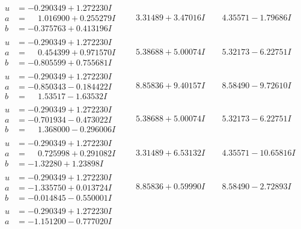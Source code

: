 \documentclass[1p]{elsarticle_modified}
\theoremstyle{definition}
\begin{document}
$$\begin{array}{c|c|c}
 \hline 
\begin{aligned}
u &= -0.290349 + 1.272230 I \\
a &= \phantom{-}1.016900 + 0.255279 I \\
b &= -0.375763 + 0.413196 I\end{aligned}
 & \phantom{-}3.31489 + 3.47016 I & \phantom{-}4.35571 - 1.79686 I \\ \hline\begin{aligned}
u &= -0.290349 + 1.272230 I \\
a &= \phantom{-}0.454399 + 0.971570 I \\
b &= -0.805599 + 0.755681 I\end{aligned}
 & \phantom{-}5.38688 + 5.00074 I & \phantom{-}5.32173 - 6.22751 I \\ \hline\begin{aligned}
u &= -0.290349 + 1.272230 I \\
a &= -0.850343 - 0.184422 I \\
b &= \phantom{-}1.53517 - 1.63532 I\end{aligned}
 & \phantom{-}8.85836 + 9.40157 I & \phantom{-}8.58490 - 9.72610 I \\ \hline\begin{aligned}
u &= -0.290349 + 1.272230 I \\
a &= -0.701934 - 0.473022 I \\
b &= \phantom{-}1.368000 - 0.296006 I\end{aligned}
 & \phantom{-}5.38688 + 5.00074 I & \phantom{-}5.32173 - 6.22751 I \\ \hline\begin{aligned}
u &= -0.290349 + 1.272230 I \\
a &= \phantom{-}0.725998 + 0.291082 I \\
b &= -1.32280 + 1.23898 I\end{aligned}
 & \phantom{-}3.31489 + 6.53132 I & \phantom{-}4.35571 - 10.65816 I \\ \hline\begin{aligned}
u &= -0.290349 + 1.272230 I \\
a &= -1.335750 + 0.013724 I \\
b &= -0.014845 - 0.550001 I\end{aligned}
 & \phantom{-}8.85836 + 0.59990 I & \phantom{-}8.58490 - 2.72893 I \\ \hline\begin{aligned}
u &= -0.290349 + 1.272230 I \\
a &= -1.151200 - 0.777020 I \\

\end{aligned}
\end{array}$$
\end{document}
